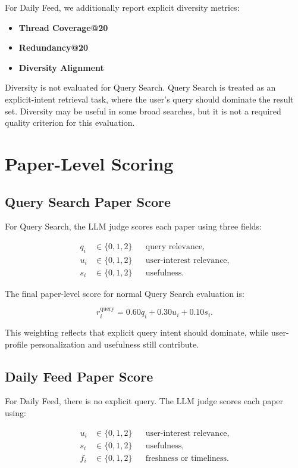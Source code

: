 \documentclass[11pt]{article}
\begin{document}
For Daily Feed, we additionally report explicit diversity metrics:

\begin{itemize}[leftmargin=*]
    \item \textbf{Thread Coverage@20}
    \item \textbf{Redundancy@20}
    \item \textbf{Diversity Alignment}
\end{itemize}

Diversity is not evaluated for Query Search. Query Search is treated as an explicit-intent retrieval task, where the user's query should dominate the result set. Diversity may be useful in some broad searches, but it is not a required quality criterion for this evaluation.

\section{Paper-Level Scoring}

\subsection{Query Search Paper Score}

For Query Search, the LLM judge scores each paper using three fields:

\begin{align*}
q_i &\in \{0,1,2\} && \text{query relevance}, \\
u_i &\in \{0,1,2\} && \text{user-interest relevance}, \\
s_i &\in \{0,1,2\} && \text{usefulness}.
\end{align*}

The final paper-level score for normal Query Search evaluation is:

\[
r_i^{\text{query}} =
0.60 q_i + 0.30 u_i + 0.10 s_i.
\]

This weighting reflects that explicit query intent should dominate, while user-profile personalization and usefulness still contribute.

\subsection{Daily Feed Paper Score}

For Daily Feed, there is no explicit query. The LLM judge scores each paper using:

\begin{align*}
u_i &\in \{0,1,2\} && \text{user-interest relevance}, \\
s_i &\in \{0,1,2\} && \text{usefulness}, \\
f_i &\in \{0,1,2\} && \text{freshness or timeliness}.
\end{align*}
\end{document}
